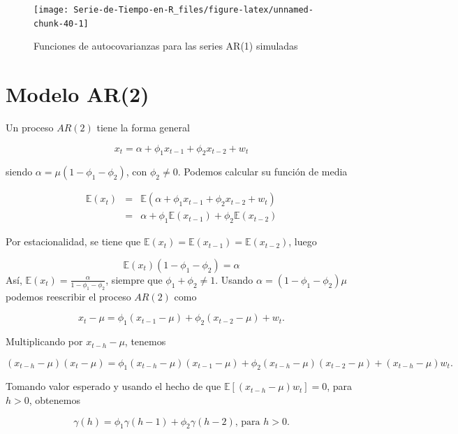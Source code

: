\documentclass[12pt,]{krantz}
\theoremstyle{definition}
\theoremstyle{definition}
\theoremstyle{definition}
\theoremstyle{remark}
\begin{document}
\begin{figure}

{\centering \texttt{[image: Serie-de-Tiempo-en-R\_files/figure-latex/unnamed-chunk-40-1]} 

}

\caption{Funciones de autocovarianzas para las series AR(1) simuladas}\label{fig:unnamed-chunk-40}
\end{figure}

\section{Modelo AR(2)}\label{modelo-ar2}

Un proceso \(AR(2)\) tiene la forma general

\begin{equation}
x_t = \alpha + \phi_1 x_{t-1} + \phi_2 x_{t-2} + w_t
\label{eq:eq-AR2}
\end{equation}

siendo \(\alpha = \mu(1-\phi_1-\phi_2)\), con \(\phi_2\neq 0\). Podemos
calcular su función de media

\begin{eqnarray*}
\mathbb{E}(x_t) &=& \mathbb{E}(\alpha + \phi_1 x_{t-1} + \phi_2 x_{t-2} + w_t) \\
    &=& \alpha+\phi_1\mathbb{E}(x_{t-1})+\phi_2\mathbb{E}(x_{t-2})
\end{eqnarray*}

Por estacionalidad, se tiene que
\(\mathbb{E}(x_t)=\mathbb{E}(x_{t-1})=\mathbb{E}(x_{t-2})\), luego

\[\mathbb{E}(x_t)(1-\phi_1-\phi_2) = \alpha\] Así,
\(\mathbb{E}(x_t) = \frac{\alpha}{1-\phi_1-\phi_2}\), siempre que
\(\phi_1+\phi_2\neq1\). Usando \(\alpha=(1-\phi_1-\phi_2)\mu\) podemos
reescribir el proceso \(AR(2)\) como

\[x_t-\mu = \phi_1(x_{t-1}-\mu)+\phi_2(x_{t-2}-\mu)+w_t.\]

Multiplicando por \(x_{t-h}-\mu\), tenemos

\[(x_{t-h}-\mu)(x_t-\mu) = \phi_1(x_{t-h}-\mu)(x_{t-1}-\mu) + \phi_2(x_{t-h}-\mu)(x_{t-2}-\mu) + (x_{t-h}-\mu)w_t.\]

Tomando valor esperado y usando el hecho de que
\(\mathbb{E}[(x_{t-h}-\mu)w_t]=0\), para \(h>0\), obtenemos

\begin{equation}
\gamma(h) = \phi_1\gamma(h-1)+\phi_2\gamma(h-2) \text{, para }h>0.
\label{eq:eq-ecuacion-momento-AR2}
\end{equation}
\end{document}
